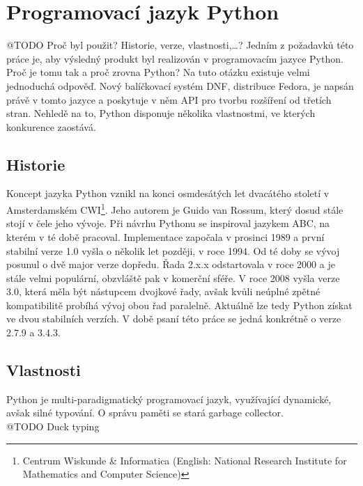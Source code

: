 \documentclass[10pt,a4paper]{article}
\begin{document}
	\pagebreak
	\section{Programovací jazyk Python}
	@TODO Proč byl použit? Historie, verze, vlastnosti,\dots?
	Jedním z požadavků této práce je, aby výsledný produkt byl realizován v programovacím jazyce Python. Proč je tomu tak a proč zrovna Python? Na tuto otázku existuje velmi jednoduchá odpověď. Nový balíčkovací systém DNF, distribuce Fedora, je napsán právě v tomto jazyce a poskytuje v něm API pro tvorbu rozšíření od třetích stran. Nehledě na to, Python disponuje několika vlastnostmi, ve kterých konkurence zaostává.

		\subsection{Historie}
		Koncept jazyka Python vznikl na konci osmdesátých let dvacátého století v Amsterdamském CWI\footnote{Centrum Wiskunde \& Informatica (English: National Research Institute for Mathematics and Computer Science)}. Jeho autorem je Guido van Rossum, který dosud stále stojí v čele jeho vývoje. Při návrhu Pythonu se inspiroval jazykem ABC, na kterém v té době pracoval. Implementace započala v prosinci 1989 a první stabilní verze 1.0 vyšla o několik let později, v roce 1994. Od té doby se vývoj posunul o dvě major verze dopředu. Řada 2.x.x odstartovala v roce 2000 a je stále velmi populární, obzvláště pak v komerční sféře.  V roce 2008 vyšla verze 3.0, která měla být nástupcem dvojkové řady, avšak kvůli neúplné zpětné kompatibilitě probíhá vývoj obou řad paralelně. Aktuálně lze tedy Python získat ve dvou stabilních verzích. V době psaní této práce se jedná konkrétně o verze 2.7.9 a 3.4.3.

		\subsection{Vlastnosti}
		Python je multi-paradigmatický programovací jazyk, využívající dynamické, avšak silné typování. O správu paměti se stará garbage collector.
		\\@TODO Duck typing

\end{document}
